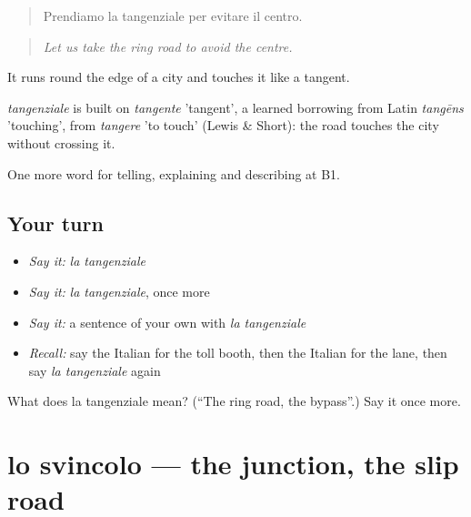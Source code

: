 \begin{quote}
Prendiamo la tangenziale per evitare il centro.
\end{quote}

\begin{quote}
\emph{Let us take the ring road to avoid the centre.}
\end{quote}

It runs round the edge of a city and touches it like a tangent.

\begin{cousinweb}
\emph{tangenziale} is built on \emph{tangente} 'tangent', a learned borrowing from Latin \emph{tangēns} 'touching', from \emph{tangere} 'to touch' (Lewis \& Short): the road touches the city without crossing it.
\end{cousinweb}

\begin{grammarlens}[title={What you've built}]
One more word for telling, explaining and describing at B1.
\end{grammarlens}

\subsection*{Your turn}
\begin{itemize}
\raggedright
  \item \emph{Say it:} \emph{la tangenziale}
  \item \emph{Say it:} \emph{la tangenziale}, once more
  \item \emph{Say it:} a sentence of your own with \emph{la tangenziale}
  \item \emph{Recall:} say the Italian for the toll booth, then the Italian for the lane, then say \emph{la tangenziale} again
\end{itemize}

\begin{tcolorbox}[breakable,colback=teal!4,colframe=teal!35!black,title={Before you move on}]
What does la tangenziale mean? (\textquotedblleft{}The ring road, the bypass\textquotedblright{}.) Say it once more.
\end{tcolorbox}
\section[lo svincolo]{lo svincolo — the junction, the slip road}

\label{lesson:IT-C405-svincolo}



